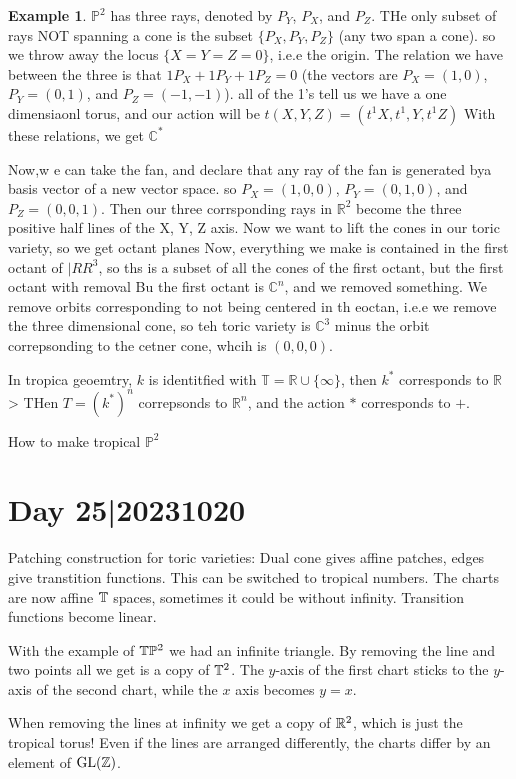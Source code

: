 \documentclass[12pt]{memoir}
\theoremstyle{definition}
\newtheorem{protoexample}{Example}[section]
\newenvironment{ex}
   {\begin{protoexample}}
   {\end{protoexample}}
\def\RR{{\mathbb R}}
\def\CC{{\mathbb C}}
\def\TT{{\mathbb T}}
\def\PP{{\mathbb P}}
\begin{document}
\begin{ex}
    $\PP^2$ has three rays, denoted by $P_Y$, $P_X$, and $P_Z$. THe only subset of rays NOT spanning a cone is the subset $\{P_X, P_Y, P_Z\}$ (any two span a cone). so we throw away the locus $\{X=Y=Z=0\}$, i.e.e the origin. The relation we have between the three is that $1P_X + 1 P_Y + 1 P_Z=0$ (the vectors are $P_X=(1,0)$, $P_Y=(0,1)$, and $P_Z=(-1,-1)$). all of the 1's tell us we have a one dimensiaonl torus, and our action will be $t(X,Y,Z) = (t^1 X,t^1,Y,t^1Z)$ With these relations, we get $\CC^*$

    Now,w e can take the fan, and declare that any ray of the fan is generated bya  basis vector of a new vector space. so $P_X=(1,0,0)$, $P_Y=(0,1,0)$, and $P_Z=(0,0,1)$. Then our three corrsponding rays in $\RR^2$ become the three positive half lines of the X, Y, Z axis. Now we want to lift the cones in our toric variety, so we get octant planes Now, everything we make is contained in the first octant of $|RR^3$, so ths is a subset of all the cones of the first octant, but the first octant with removal Bu the first octant is $\CC^n$, and we removed something. We remove orbits corresponding to not being centered in th eoctan, i.e.e we remove the three dimensional cone, so teh toric variety is $\CC^3$ minus the orbit correpsonding to the cetner cone, whcih is $(0,0,0)$.
\end{ex}





In tropica geoemtry, $k $ is identitfied with $\TT= \RR \cup \{\infty\}$, then $k^*$ corresponds to $\RR$> THen $T= (k^*)^n$ correpsonds to $\RR^n$, and the action $*$ corresponds to $+$. 



How to make tropical $\PP^2$




\section{Day 25|20231020}

Patching construction for toric varieties: Dual cone gives affine patches, edges give transtition functions. This can be switched to tropical numbers. The charts are now affine $\mathbb{T}$ spaces, sometimes it could be without infinity. Transition functions become linear.\par 
With the example of $\mathbb{T}\mathbb{P}^2$ we had an infinite triangle. By removing the line and two points all we get is a copy of $\mathbb{T}^2$. The $y$-axis of the first chart sticks to the $y$-axis of the second chart, while the $x$ axis becomes $y=x$. 
\begin{Rmk}
When removing the lines at infinity we get a copy of $\mathbb{R}^2$, which is just the tropical torus! Even if the lines are arranged differently, the charts differ by an element of $\operatorname{GL}(\mathbb{Z})$. 
\end{Rmk}
\end{document}
